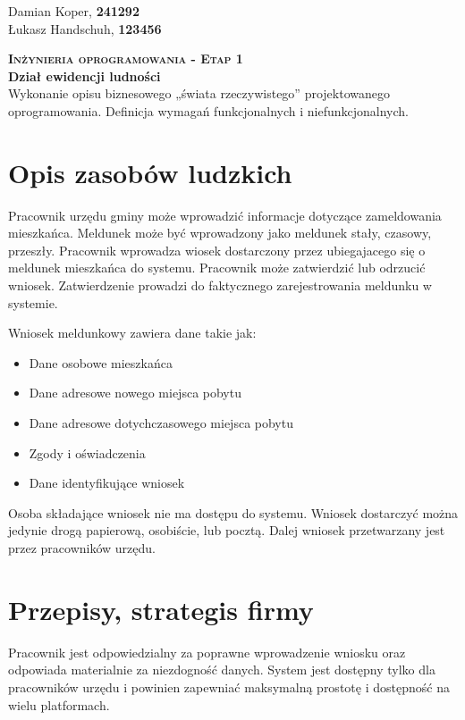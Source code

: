 \documentclass[12pt]{article}
\begin{document}
\begin{flushright}
        Damian Koper, \textbf{241292} \\
        Łukasz Handschuh, \textbf{123456}
\end{flushright}
\vspace{1cm}
{
    \centering
    {\Huge\scshape\bfseries Inżynieria oprogramowania - Etap 1 }\\
    \vspace{0.25cm}
    \Large\textbf{Dział ewidencji ludności} \\
    \vspace{0.25cm}
    \large Wykonanie opisu biznesowego „świata rzeczywistego” projektowanego oprogramowania. Definicja wymagań funkcjonalnych i niefunkcjonalnych.\\
}

\section{Opis zasobów ludzkich}

Pracownik urzędu gminy może wprowadzić informacje dotyczące zameldowania mieszkańca. Meldunek może być wprowadzony jako meldunek stały, czasowy, przeszły. Pracownik wprowadza wiosek dostarczony przez ubiegajacego się o meldunek mieszkańca do systemu. Pracownik może zatwierdzić lub odrzucić wniosek. Zatwierdzenie prowadzi do faktycznego zarejestrowania meldunku w systemie.

Wniosek meldunkowy zawiera dane takie jak:
\begin{itemize}
    \item Dane osobowe mieszkańca
    \item Dane adresowe nowego miejsca pobytu
    \item Dane adresowe dotychczasowego miejsca pobytu
    \item Zgody i oświadczenia
    \item Dane identyfikujące wniosek
\end{itemize}

Osoba składające wniosek nie ma dostępu do systemu. Wniosek dostarczyć można jedynie drogą papierową, osobiście, lub pocztą. Dalej wniosek przetwarzany jest przez pracowników urzędu.

\section{Przepisy, strategis firmy}

Pracownik jest odpowiedzialny za poprawne wprowadzenie wniosku oraz odpowiada materialnie za niezdogność danych. System jest dostępny tylko dla pracowników urzędu i powinien zapewniać maksymalną prostotę i dostępność na wielu platformach.
\end{document}
